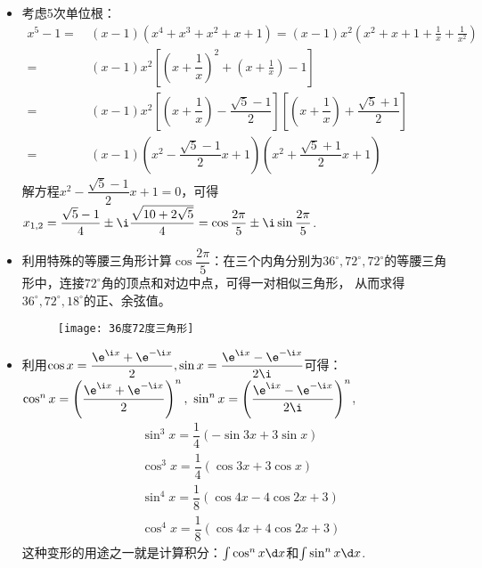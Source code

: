 \begin{itemize}[leftmargin=\inteval{\myitemleftmargin}pt,itemsep=
   \inteval{\myitemitempsep}pt,topsep=\inteval{\myitemtopsep}pt]
另外，根据$ T_3(u)-T_2(u)=4u^3-3u-(2u^2-1)=(u-1)(4u^2+2u-1) $，有
\begin{align*}
    \cos3x-\cos2x=(\cos x-1)(4\cos^2x+2\cos x-1)=0
\end{align*}
显然，$ \dfrac{2\pi}{5} $是方程$ \cos3x-\cos2x=0 $的一个根。解二次方程
$ 4u^2+2u-1=0 $可得：$ \cos\dfrac{2\pi}{5}=u=\dfrac{\sqrt{5}-1}{4} $. 

\item 考虑5次单位根：
\begin{align*}
    x^5-1=&\ (x-1)(x^4+x^3+x^2+x+1)=(x-1) x^2 \left(x^2+x+1+\frac{1}{x}+\frac{1}{x^2} \right)  \\
    =&\  (x-1) x^2 \left[\left( x+\dfrac{1}{x} \right)^2+ \left( x+\frac{1}{x} \right)-1  \right] \\
    =&\ (x-1) x^2\left[ \left(x+\dfrac{1}{x} \right)-\dfrac{\sqrt{5}-1}{2}  \right] 
    \left[ \left(x+\dfrac{1}{x} \right)+\dfrac{\sqrt{5}+1}{2} \right]   \\
    =&\  (x-1)\left( x^2-\dfrac{\sqrt{5}-1}{2}x+1\right) \left( x^2+\dfrac{\sqrt{5}+1}{2}x+1\right) 
\end{align*}
解方程$  x^2-\dfrac{\sqrt{5}-1}{2}x+1=0 $，可得$ x_{1,2}=\dfrac{\sqrt{5}-1}{4}
\pm \i\dfrac{\sqrt{10+2\sqrt{5}}}{4}=\cos\dfrac{2\pi}{5}\pm \i \sin \dfrac{2\pi}{5} $. 

\item 利用特殊的等腰三角形计算$ \cos\dfrac{2\pi}{5} $：在三个内角分别为$ 36^{\circ},
72^{\circ},72^{\circ}$的等腰三角形中，连接$ 72^{\circ} $角的顶点和对边中点，可得一对相似三角形，
从而求得$ 36^{\circ},72^{\circ},18^{\circ} $的正、余弦值。
\begin{figure}[h]
    \centering
    \texttt{[image: 36度72度三角形]}
\end{figure}

\item 利用$ \cos x=\dfrac{\e^{\i x}+\e^{-\i x}}{2},
\sin x=\dfrac{\e^{\i x}-\e^{-\i x}}{2\i} $可得：$
\cos^n x=\left( \dfrac{\e^{\i x}+\e^{-\i x}}{2}\right)^n,\ 
\sin^n x=\left(\dfrac{\e^{\i x}-\e^{-\i x}}{2\i}\right)^n $,
\begin{align*}
    &  \sin^3 x=\dfrac{1}{4}(-\sin3x+3\sin x)  \\
    &  \cos^3 x=\dfrac{1}{4}( \cos3x+3\cos x)	\\
    &  \sin^4 x=\dfrac{1}{8}(\cos 4x-4\cos 2x+3)  \\
    &  \cos^4 x=\dfrac{1}{8}(\cos 4x+4\cos 2x+3) 
\end{align*}
这种变形的用途之一就是计算积分：$ \int \cos^n x \d x $和$ \int \sin^n x \d x $. 

\end{itemize}

